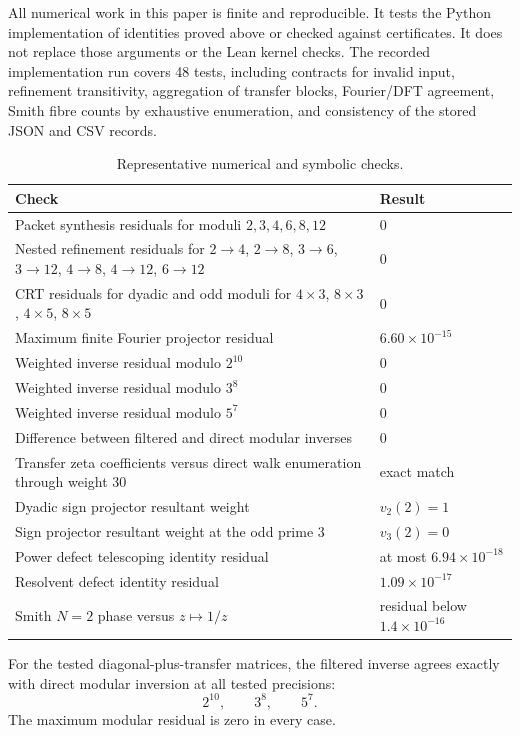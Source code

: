 All numerical work in this paper is finite and reproducible. It tests the
Python implementation of identities proved above or checked against
certificates. It does not replace those arguments or the Lean kernel checks.
The recorded implementation run covers 48 tests, including contracts for invalid input, refinement
transitivity, aggregation of transfer blocks, Fourier/DFT agreement, Smith
fibre counts by exhaustive enumeration, and consistency of the stored JSON
and CSV records.

\begin{table}[htbp]
\centering
\caption{Representative numerical and symbolic checks.}
\begin{tabularx}{\textwidth}{L{0.54\textwidth}Y}
\toprule
Check & Result \\
\midrule
Packet synthesis residuals for moduli $2,3,4,6,8,12$ & $0$ \\
Nested refinement residuals for $2\to4$, $2\to8$, $3\to6$, $3\to12$, $4\to8$, $4\to12$, $6\to12$ & $0$ \\
CRT residuals for dyadic and odd moduli for $4\times3$, $8\times3$, $4\times5$, $8\times5$ & $0$ \\
Maximum finite Fourier projector residual & $6.60\times10^{-15}$ \\
Weighted inverse residual modulo $2^{10}$ & $0$ \\
Weighted inverse residual modulo $3^8$ & $0$ \\
Weighted inverse residual modulo $5^7$ & $0$ \\
Difference between filtered and direct modular inverses & $0$ \\
Transfer zeta coefficients versus direct walk enumeration through weight $30$ & exact match \\
Dyadic sign projector resultant weight & $v_2(2)=1$ \\
Sign projector resultant weight at the odd prime $3$ & $v_3(2)=0$ \\
Power defect telescoping identity residual & at most $6.94\times10^{-18}$ \\
Resolvent defect identity residual & $1.09\times10^{-17}$ \\
Smith $N=2$ phase versus $z\mapsto1/z$ & residual below $1.4\times10^{-16}$ \\
\bottomrule
\end{tabularx}
\end{table}

\begin{certificate}
For the tested diagonal-plus-transfer matrices, the filtered inverse agrees exactly with direct modular inversion at all tested precisions:
\[
2^{10},\qquad3^8,\qquad5^7.
\]
The maximum modular residual is zero in every case.
\end{certificate}


